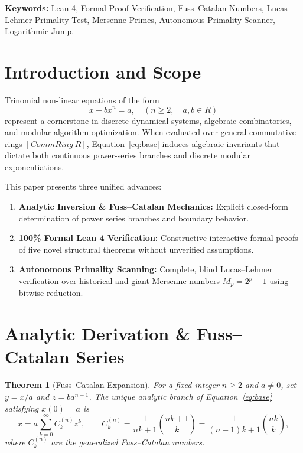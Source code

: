 \documentclass[11pt,a4paper]{article}
\newtheorem{theorem}{Theorem}[section]
\theoremstyle{definition}
\begin{document}
\textbf{Keywords:} Lean 4, Formal Proof Verification, Fuss--Catalan Numbers, Lucas--Lehmer Primality Test, Mersenne Primes, Autonomous Primality Scanner, Logarithmic Jump.

\section{Introduction and Scope}

Trinomial non-linear equations of the form
\begin{equation}\label{eq:base}
x - b x^n = a, \quad (n \ge 2, \quad a,b \in R)
\end{equation}
represent a cornerstone in discrete dynamical systems, algebraic combinatorics, and modular algorithm optimization. When evaluated over general commutative rings $[CommRing\ R]$, Equation~\eqref{eq:base} induces algebraic invariants that dictate both continuous power-series branches and discrete modular exponentiations.

This paper presents three unified advances:
\begin{enumerate}
    \item \textbf{Analytic Inversion \& Fuss--Catalan Mechanics:} Explicit closed-form determination of power series branches and boundary behavior.
    \item \textbf{100\% Formal Lean 4 Verification:} Constructive interactive formal proofs of five novel structural theorems without unverified assumptions.
    \item \textbf{Autonomous Primality Scanning:} Complete, blind Lucas--Lehmer verification over historical and giant Mersenne numbers $M_p = 2^p - 1$ using bitwise reduction.
\end{enumerate}

\section{Analytic Derivation \& Fuss--Catalan Series}

\begin{theorem}[Fuss--Catalan Expansion]
For a fixed integer $n \ge 2$ and $a \neq 0$, set $y = x/a$ and $z = b a^{n-1}$. The unique analytic branch of Equation~\eqref{eq:base} satisfying $x(0) = a$ is
\begin{equation}
x = a \sum_{k=0}^{\infty} C_k^{(n)} z^k, \qquad C_k^{(n)} = \frac{1}{nk+1}\binom{nk+1}{k} = \frac{1}{(n-1)k+1}\binom{nk}{k},
\end{equation}
where $C_k^{(n)}$ are the generalized Fuss--Catalan numbers.
\end{theorem}
\end{document}
